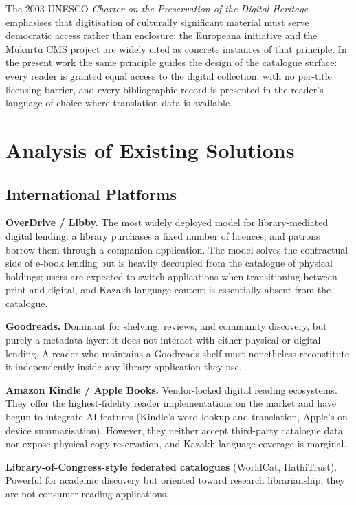 \documentclass[12pt,a4paper]{report}
\begin{document}
The 2003 UNESCO \textit{Charter on the Preservation of the Digital
Heritage} \cite{unesco2003} emphasises that digitisation of culturally
significant material must serve democratic access rather than enclosure;
the Europeana initiative \cite{europeana2020} and the Mukurtu CMS project
\cite{christen2012} are widely cited as concrete instances of that
principle. In the present work the same principle guides the design of the
catalogue surface: every reader is granted equal access to the digital
collection, with no per-title licensing barrier, and every bibliographic
record is presented in the reader's language of choice where translation
data is available.

\section{Analysis of Existing Solutions}

\subsection{International Platforms}

\textbf{OverDrive / Libby.} The most widely deployed model for
library-mediated digital lending: a library purchases a fixed number of
licences, and patrons borrow them through a companion application. The
model solves the contractual side of e-book lending but is heavily
decoupled from the catalogue of physical holdings; users are expected to
switch applications when transitioning between print and digital, and
Kazakh-language content is essentially absent from the catalogue.

\textbf{Goodreads.} Dominant for shelving, reviews, and community
discovery, but purely a metadata layer: it does not interact with either
physical or digital lending. A reader who maintains a Goodreads shelf must
nonetheless reconstitute it independently inside any library application
they use.

\textbf{Amazon Kindle / Apple Books.} Vendor-locked digital reading
ecosystems. They offer the highest-fidelity reader implementations on the
market and have begun to integrate AI features (Kindle's word-lookup and
translation, Apple's on-device summarisation). However, they neither
accept third-party catalogue data nor expose physical-copy reservation,
and Kazakh-language coverage is marginal.

\textbf{Library-of-Congress-style federated catalogues} (WorldCat,
HathiTrust). Powerful for academic discovery but oriented toward research
librarianship; they are not consumer reading applications.
\end{document}

